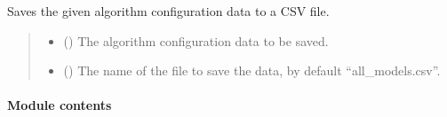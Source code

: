 \documentclass[letterpaper,10pt,english]{sphinxmanual}
\begin{document}
\begin{fulllineitems}
\begin{fulllineitems}
\label{\detokenize{infrastructure.repository:infrastructure.repository.TrainRepositoryInFile.TrainRepositoryInFile.save}}
\pysigstartsignatures
{}
\pysigstopsignatures
\sphinxAtStartPar
Saves the given algorithm configuration data to a CSV file.
\begin{quote}\begin{description}
\begin{itemize}
\item {} 
\sphinxAtStartPar
{} ({\hyperref[\detokenize{domain.interfaces:domain.interfaces.AlgorithmConfigurator.AlgorithmConfigurator}]{}}) \textendash{} The algorithm configuration data to be saved.

\item {} 
\sphinxAtStartPar
{} (\sphinxstyleliteralemphasis{\sphinxupquote{, }}) \textendash{} The name of the file to save the data, by default “all\_models.csv”.

\end{itemize}

\end{description}\end{quote}

\end{fulllineitems}


\end{fulllineitems}



\paragraph{Module contents}
\label{\detokenize{infrastructure.repository:module-infrastructure.repository}}\label{\detokenize{infrastructure.repository:module-contents}}
\end{document}

